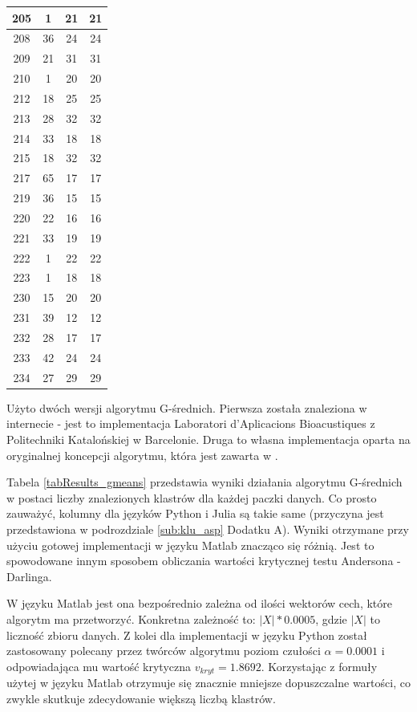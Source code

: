 \begin{table}[!tp]
\begin{tabular}{|c|c|c|c|}
		205 &  1 & 21 & 21\\ \hline
		208 & 36 & 24 & 24\\ \hline
		209 & 21 & 31 & 31\\ \hline
		210 &  1 & 20 & 20\\ \hline
		212 & 18 & 25 & 25\\ \hline
		213 & 28 & 32 & 32\\ \hline
		214 & 33 & 18 & 18\\ \hline
		215 & 18 & 32 & 32\\ \hline
		217 & 65 & 17 & 17\\ \hline
		219 & 36 & 15 & 15\\ \hline
		220 & 22 & 16 & 16\\ \hline	
		221 & 33 & 19 & 19\\ \hline
		222 &  1 & 22 & 22\\ \hline
		223 &  1 & 18 & 18\\ \hline
		230 & 15 & 20 & 20\\ \hline
		231 & 39 & 12 & 12\\ \hline
		232 & 28 & 17 & 17\\ \hline
		233 & 42 & 24 & 24\\ \hline
		234 & 27 & 29 & 29\\ \hline
	\end{tabular}
\end{table}

\qquad Użyto dwóch wersji algorytmu G-średnich. Pierwsza została znaleziona w internecie - jest to implementacja Laboratori d'Aplicacions Bioacustiques z Politechniki Katalońskiej w Barcelonie. Druga to własna implementacja oparta na oryginalnej koncepcji algorytmu, która jest zawarta w \cite{GMeans}.

Tabela \ref{tabResults_gmeans} przedstawia wyniki działania algorytmu G-średnich w postaci liczby znalezionych klastrów dla każdej paczki danych. Co prosto zauważyć, kolumny dla języków Python i Julia są takie same (przyczyna jest przedstawiona w podrozdziale \ref{sub:klu_asp} Dodatku A). Wyniki otrzymane przy użyciu gotowej implementacji w języku Matlab znacząco się różnią. Jest to spowodowane innym sposobem obliczania wartości krytycznej testu Andersona - Darlinga.

W języku Matlab jest ona bezpośrednio zależna od ilości wektorów cech, które algorytm ma przetworzyć. Konkretna zależność to: $|X| * 0.0005$, gdzie $|X|$ to liczność zbioru danych. Z kolei dla implementacji w języku Python został zastosowany polecany przez twórców algorytmu poziom czułości $\alpha = 0.0001$ i odpowiadająca mu wartość krytyczna $v_{kryt} = 1.8692$. Korzystając z formuły użytej w języku Matlab otrzymuje się znacznie mniejsze dopuszczalne wartości, co zwykle skutkuje zdecydowanie większą liczbą klastrów.


